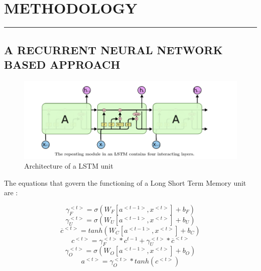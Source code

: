 \documentclass[a4paper,11pt]{article}
\begin{document}
\section{METHODOLOGY}
\hrule
\vspace*{5mm}
\subsection{A RECURRENT NEURAL NETWORK BASED APPROACH}
\begin{figure}[ht]
    \centering
    \includegraphics[width=\linewidth]{x.png}
    \caption{Architecture of a LSTM unit}
    \label{fig:my_label}
\end{figure}


The equations that govern the functioning of a Long Short Term Memory unit are :

 \begin{equation}
     \gamma_F^{<t>} = \sigma(W_F  [a^{<t-1>}, x^{<t>}] + b_F)
 \end{equation}
 \begin{equation}
     \gamma_U^{<t>} = \sigma(W_U  [a^{<t-1>}, x^{<t>}] + b_U)
 \end{equation}
 \begin{equation}
     \overline{c}^{<t>} = tanh(W_C[a^{<t-1>}, x^{<t>}] + b_C)
 \end{equation}
 \begin{equation}
     c^{<t>} = \gamma_F^{<t>} * c^{t-1} + \gamma_U^{<t>} * \overline{c}^{<t>}
 \end{equation}
 \begin{equation}
     \gamma_O^{<t>} = \sigma(W_O  [a^{<t-1>}, x^{<t>}] + b_O)
 \end{equation}
 \begin{equation}
    a^{<t>} = \gamma_O^{<t>} * tanh(c^{<t>})
 \end{equation}
 
\end{document}
